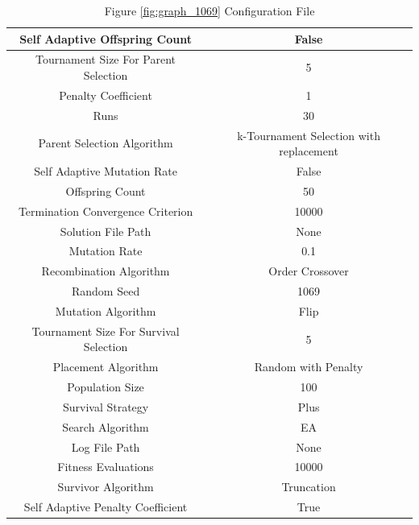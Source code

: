 \documentclass{standalone}
\begin{document}
\begin{table}[!htb]
	\centering
	\caption{Figure \ref{fig:graph_1069} Configuration File}
	\label{tab:graph_1069}
	\begin{tabular}{| c | c |}
		\hline
		Self Adaptive Offspring Count		& False		 \\
		\hline
		Tournament Size For Parent Selection		& 5		 \\
		\hline
		Penalty Coefficient		& 1		 \\
		\hline
		Runs		& 30		 \\
		\hline
		Parent Selection Algorithm		& k-Tournament Selection with replacement		 \\
		\hline
		Self Adaptive Mutation Rate		& False		 \\
		\hline
		Offspring Count		& 50		 \\
		\hline
		Termination Convergence Criterion		& 10000		 \\
		\hline
		Solution File Path		& None		 \\
		\hline
		Mutation Rate		& 0.1		 \\
		\hline
		Recombination Algorithm		& Order Crossover		 \\
		\hline
		Random Seed		& 1069		 \\
		\hline
		Mutation Algorithm		& Flip		 \\
		\hline
		Tournament Size For Survival Selection		& 5		 \\
		\hline
		Placement Algorithm		& Random with Penalty		 \\
		\hline
		Population Size		& 100		 \\
		\hline
		Survival Strategy		& Plus		 \\
		\hline
		Search Algorithm		& EA		 \\
		\hline
		Log File Path		& None		 \\
		\hline
		Fitness Evaluations		& 10000		 \\
		\hline
		Survivor Algorithm		& Truncation		 \\
		\hline
		Self Adaptive Penalty Coefficient		& True		 \\
		\hline
	\end{tabular}
\end{table}
\end{document}
